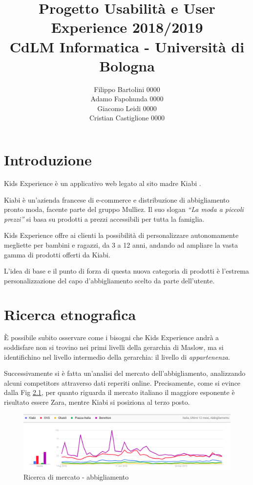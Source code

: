 \documentclass[12pt,italian,]{report}
\title{Progetto Usabilità e User Experience 2018/2019\\[0.8em]\large CdLM Informatica - Università di Bologna}
\author{Filippo Bartolini 0000 \\ Adamo Fapohunda 0000\\ Giacomo Leidi 0000 \\ Cristian Castiglione 0000}
\date{}
\begin{document}
\maketitle

{
\setcounter{tocdepth}{2}
\tableofcontents
}
\hypertarget{introduzione}{%
\chapter{Introduzione}\label{introduzione}}

Kids Experience è un applicativo web legato al sito madre Kiabi \cite{kiabi}.

Kiabi è un'azienda francese di e-commerce e distribuzione di
abbigliamento pronto moda, facente parte del gruppo Mulliez. Il suo
slogan \emph{``La moda a piccoli prezzi''} si basa su prodotti a prezzi
accessibili per tutta la famiglia.

Kids Experience offre ai clienti la possibilità di personalizzare
autonomamente megliette per bambini e ragazzi, da 3 a 12 anni, andando
ad ampliare la vasta gamma di prodotti offerti da Kiabi.

L'idea di base e il punto di forza di questa nuova categoria di prodotti
è l'estrema personalizzazione del capo d'abbigliamento scelto da parte
dell'utente.

\hypertarget{ricerca-etnografica}{%
\chapter{Ricerca etnografica}\label{ricerca-etnografica}}

È possibile subito osservare come i bisogni che Kids Experience andrà a
soddisfare non si trovino nei primi livelli della gerarchia di Maslow,
ma si identifichino nel livello intermedio della gerarchia: il livello
di \emph{appartenenza}.

Successivamente si è fatta un'analisi del mercato dell'abbigliamento,
analizzando alcuni competitors attraverso dati reperiti online.
Precisamente, come si evince dalla Fig \ref{abbigliamo_generico}, per quanto riguarda il
mercato italiano il maggiore esponente è risultato essere Zara, mentre Kiabi si
posiziona al terzo posto.

\begin{figure}[h]
\centering
\includegraphics{img/abbigliamento_generico.png}
\caption{Ricerca di mercato - abbigliamento}
\label{abbigliamo_generico}
\end{figure}
\end{document}
